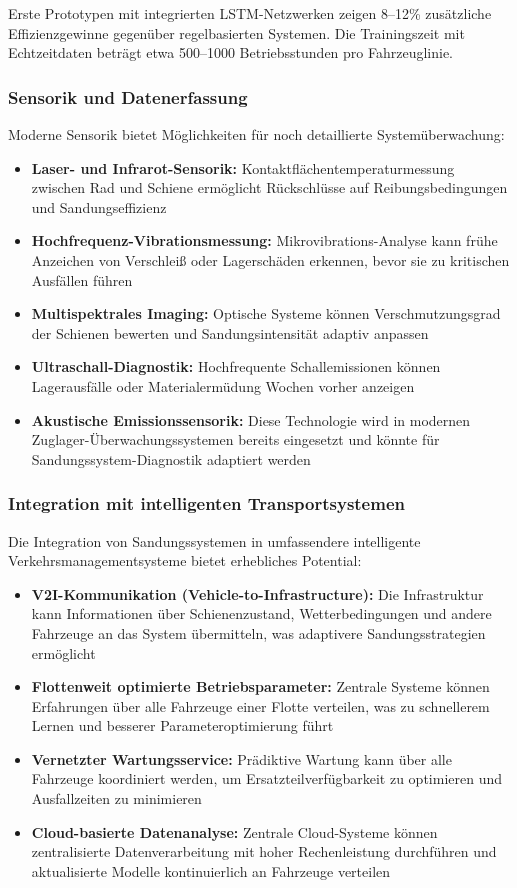 \documentclass[a4paper,12pt]{article}
\theoremstyle{definition}
\theoremstyle{remark}
\begin{document}
Erste Prototypen mit integrierten LSTM-Netzwerken zeigen 8--12\% zusätzliche Effizienzgewinne gegenüber regelbasierten Systemen. Die Trainingszeit mit Echtzeitdaten beträgt etwa 500--1000 Betriebsstunden pro Fahrzeuglinie.

\subsubsection{Sensorik und Datenerfassung}

Moderne Sensorik bietet Möglichkeiten für noch detaillierte Systemüberwachung:

\begin{itemize}
	\item \textbf{Laser- und Infrarot-Sensorik:} Kontaktflächentemperaturmessung zwischen Rad und Schiene ermöglicht Rückschlüsse auf Reibungsbedingungen und Sandungseffizienz
	\item \textbf{Hochfrequenz-Vibrationsmessung:} Mikrovibrations-Analyse kann frühe Anzeichen von Verschleiß oder Lagerschäden erkennen, bevor sie zu kritischen Ausfällen führen
	\item \textbf{Multispektrales Imaging:} Optische Systeme können Verschmutzungsgrad der Schienen bewerten und Sandungsintensität adaptiv anpassen
	\item \textbf{Ultraschall-Diagnostik:} Hochfrequente Schallemissionen können Lagerausfälle oder Materialermüdung Wochen vorher anzeigen
	\item \textbf{Akustische Emissionssensorik:} Diese Technologie wird in modernen Zuglager-Überwachungssystemen bereits eingesetzt und könnte für Sandungssystem-Diagnostik adaptiert werden
\end{itemize}

\subsubsection{Integration mit intelligenten Transportsystemen}

Die Integration von Sandungssystemen in umfassendere intelligente Verkehrsmanagementsysteme bietet erhebliches Potential:

\begin{itemize}
	\item \textbf{V2I-Kommunikation (Vehicle-to-Infrastructure):} Die Infrastruktur kann Informationen über Schienenzustand, Wetterbedingungen und andere Fahrzeuge an das System übermitteln, was adaptivere Sandungsstrategien ermöglicht
	\item \textbf{Flottenweit optimierte Betriebsparameter:} Zentrale Systeme können Erfahrungen über alle Fahrzeuge einer Flotte verteilen, was zu schnellerem Lernen und besserer Parameteroptimierung führt
	\item \textbf{Vernetzter Wartungsservice:} Prädiktive Wartung kann über alle Fahrzeuge koordiniert werden, um Ersatzteilverfügbarkeit zu optimieren und Ausfallzeiten zu minimieren
	\item \textbf{Cloud-basierte Datenanalyse:} Zentrale Cloud-Systeme können zentralisierte Datenverarbeitung mit hoher Rechenleistung durchführen und aktualisierte Modelle kontinuierlich an Fahrzeuge verteilen
\end{itemize}
\end{document}
